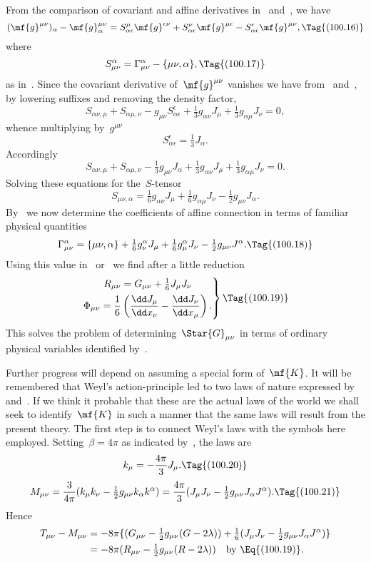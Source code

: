 \documentclass[12pt]{book}
\begin{document}
From the comparison of covariant and affine derivatives in~ and~, we have
\[
(\mf{g}^{\mu\nu})_\alpha - \mf{g}^{\mu\nu}_\alpha = S^\mu_{\alpha\epsilon}\mf{g}^{\epsilon\nu} +
                                                    S^\nu_{\alpha\epsilon}\mf{g}^{\mu\epsilon} -
                                                    S^\epsilon_{\alpha\epsilon}\mf{g}^{\mu\nu},
\Tag{(100.16)}
\]
where
\[
S^\alpha_{\mu\nu}=\Gamma^\alpha_{\mu\nu} - \{\mu\nu,\alpha\},
\Tag{(100.17)}
\]
as in~.
Since the covariant derivative of~$\mf{g}^{\mu\nu}$ vanishes we have from~ and~,
by lowering suffixes and removing the density factor,
\[
S_{\alpha\nu,\mu} + S_{\alpha\mu,\nu} - g_{\mu\nu} S^\epsilon_{\alpha\epsilon} + \tfrac{1}{3}g_{\alpha\nu}J_\mu +
  \tfrac{1}{3}g_{\alpha\mu}J_\nu = 0,
\]
whence multiplying by~$g^{\mu\nu}$
\[
S^\epsilon_{\alpha\epsilon} = \tfrac{1}{3}J_\alpha.
\]
Accordingly
\[
S_{\alpha\nu,\mu} + S_{\alpha\mu,\nu} - \tfrac{1}{3}g_{\mu\nu}J_\alpha
 + \tfrac{1}{3}g_{\alpha\nu}J_\mu + \tfrac{1}{3}g_{\alpha\mu}J_\nu = 0.
\]
Solving these equations for the~$S$\hyp{}tensor
\[
S_{\mu\nu,\alpha} = \tfrac{1}{6}g_{\alpha\nu}J_\mu + \tfrac{1}{6}g_{\alpha\mu}J_\nu - \tfrac{1}{2}g_{\mu\nu}J_\alpha.
\]
By~ we now determine the coefficients of affine connection in terms of familiar physical quantities
\[
\Gamma^\alpha_{\mu\nu} = \{\mu\nu,\alpha\}
             + \tfrac{1}{6}g^\alpha_\nu J_\mu + \tfrac{1}{6}g^\alpha_\mu J_\nu
             - \tfrac{1}{2}g_{\mu\nu}J^\alpha.
\Tag{(100.18)}
\]
Using this value in~ or~ we find after a little reduction
\[
\left.
\begin{gathered}
R_{\mu\nu} = G_{\mu\nu} + \tfrac{1}{6}J_\mu J_\nu\\
\Phi_{\mu\nu} = \frac{1}{6}\left(\frac{\dd J_\mu}{\dd x_\nu}-\frac{\dd J_\nu}{\dd x_\mu}\right).
\end{gathered}
\right\}
\Tag{(100.19)}
\]
This solves the problem of determining~$\Star{G}_{\mu\nu}$ in terms of ordinary physical variables identified
by~.

Further progress will depend on assuming a special form of~$\mf{K}$.
It will be remembered that Weyl's action\hyp{}principle led to two laws of nature expressed by~
and~.
If we think it probable that these are the actual laws of the world we shall seek to identify~$\mf{K}$
in such a manner that the same laws will result from the present theory.
The first step is to connect Weyl's laws with the symbols here employed.
Setting~$\beta=4\pi$ as indicated by~, the laws are
\[
k_\mu = -\frac{4\pi}{3}J_\mu.
\Tag{(100.20)}
\]
\[
M_{\mu\nu} = \frac{3}{4\pi}(k_\mu k_\nu - \tfrac{1}{2}g_{\mu\nu}k_\alpha k^\alpha) =
         \frac{4\pi}{3}(J_\mu J_\nu - \tfrac{1}{2}g_{\mu\nu}J_\alpha J^\alpha).
\Tag{(100.21)}
\]
Hence
\begin{align*}
T_{\mu\nu}-M_{\mu\nu} & = -8\pi\{(G_{\mu\nu} - \tfrac{1}{2}g_{\mu\nu}(G-2\lambda))+\tfrac{1}{6}(J_\mu J_\nu -\tfrac{1}{2}g_{\mu\nu}J_\alpha J^\alpha)\}\\
                      & = -8\pi (R_{\mu\nu} - \tfrac{1}{2}g_{\mu\nu}(R-2\lambda)) \quad \text{by~\Eq{(100.19)}}.
\end{align*}
\end{document}
